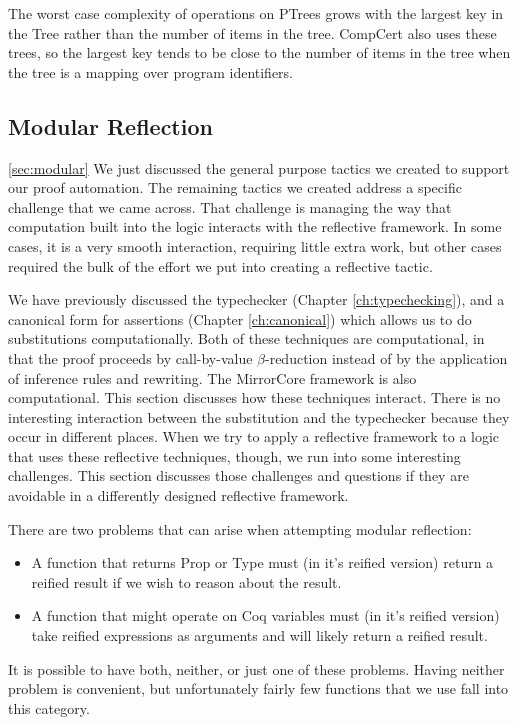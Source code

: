 \documentclass{puthesis}
\begin{document}
The worst case complexity of operations on PTrees grows with the
largest key in the Tree rather than the number of items in the
tree. CompCert also uses these trees, so the largest key tends to be
close to the number of items in the tree when the tree is a mapping
over program identifiers. 


\subsection{Modular Reflection}
\ref{sec:modular}
We just discussed the general purpose tactics we created to support
our proof automation. The remaining tactics we created address a specific
challenge that we came across. That challenge is managing the way that
computation built into the logic interacts with the reflective
framework. In some cases, it is a very smooth interaction, requiring
little extra work, but other cases required the bulk of the effort we
put into creating a reflective tactic.

We have previously discussed the typechecker (Chapter
\ref{ch:typechecking}), and a canonical form for assertions (Chapter
\ref{ch:canonical}) which allows us to do substitutions
computationally.  Both of these techniques are computational, in that
the proof proceeds by call-by-value $\beta$-reduction instead of by the application of
inference rules and rewriting.  The MirrorCore framework is also
computational. This section discusses how these techniques
interact. There is no interesting interaction between the substitution
and the typechecker because they occur in different places. When we
try to apply a reflective framework to a logic that uses these
reflective techniques, though, we run into some interesting
challenges. This section discusses those challenges and questions if
they are avoidable in a differently designed reflective framework.

There are two problems that can arise when attempting modular reflection:

\begin{itemize}
\item A function that returns Prop or Type must (in it's reified version) return a reified
  result if we wish to reason about the result.
\item A function that might operate on Coq variables must (in it's
  reified version) take reified
  expressions as arguments and will likely return a reified result.
\end{itemize}

It is possible to have both, neither, or just one of these problems.
Having neither problem is convenient, but unfortunately fairly few
functions that we use fall into this category. 
\end{document}
